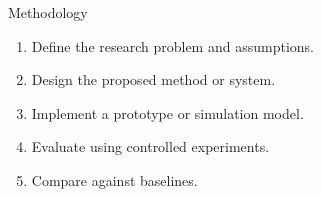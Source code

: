 \begin{frame}{Methodology}

\begin{enumerate}
    \item Define the research problem and assumptions.
    \item Design the proposed method or system.
    \item Implement a prototype or simulation model.
    \item Evaluate using controlled experiments.
    \item Compare against baselines.
\end{enumerate}

\end{frame}
